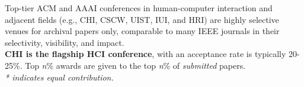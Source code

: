 \documentclass[10pt, a4paper]{article}
\newcommand{\years}[1]{\marginnote{\normalsize #1}}
\begin{document}
\noindent
Top-tier ACM and AAAI conferences in human-computer interaction and adjacent fields (e.g., CHI, CSCW, UIST, IUI, and HRI) are highly selective venues for archival papers only, comparable to many IEEE journals in their selectivity, visibility, and impact.\\[0.1cm]
\textbf{CHI is the flagship HCI conference}, with an acceptance rate is typically 20-25\%. Top \textit{n}\% awards are given to the top \textit{n}\% of \textit{submitted} papers.\\[0.1cm]
\emph{* indicates equal contribution.}\\
\end{document}
